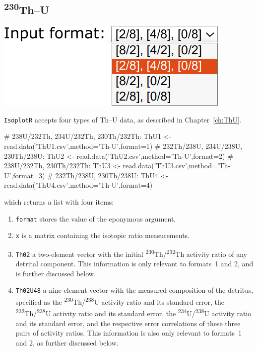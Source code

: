 \begin{refsection}

\chapter{\textsuperscript{230}Th--U}\label{ch:ThU-R}

\noindent\begin{minipage}[t]{.3\linewidth}
\strut\vspace*{-\baselineskip}\newline
\includegraphics[width=\linewidth]{../figures/ThUformats.png}
\end{minipage}
\begin{minipage}[t]{.7\linewidth}
\texttt{IsoplotR} accepts four types of Th--U data, as
  described in Chapter~\ref{ch:ThU}.
\end{minipage}

\begin{script}
# 238U/232Th, 234U/232Th, 230Th/232Th:
ThU1 <- read.data('ThU1.csv',method='Th-U',format=1)
# 232Th/238U, 234U/238U, 230Th/238U:
ThU2 <- read.data('ThU2.csv',method='Th-U',format=2)
# 238U/232Th, 230Th/232Th:
ThU3 <- read.data('ThU3.csv',method='Th-U',format=3)
# 232Th/238U, 230Th/238U:
ThU4 <- read.data('ThU4.csv',method='Th-U',format=4)
\end{script}

\noindent which returns a list with four items:

\begin{enumerate}
\item\texttt{format} stores the value of the eponymous argument,
\item\texttt{x} is a matrix containing the isotopic ratio measurements.
\item\texttt{Th02} a two-element vector with the initial
  \textsuperscript{230}Th/\textsuperscript{232}Th activity ratio of
  any detrital component. This information is only relevant to
  formats~1 and 2, and is further discussed below.
\item\texttt{Th02U48} a nine-element vector with the measured
  composition of the detritus, specified as the
  \textsuperscript{230}Th/\textsuperscript{238}U activity ratio and
  its standard error, the
  \textsuperscript{232}Th/\textsuperscript{238}U activity ratio and
  its standard error, the
  \textsuperscript{234}U/\textsuperscript{238}U activity ratio and its
  standard error, and the respective error correlations of these three
  pairs of activity ratios. This information is also only relevant to
  formats~1 and 2, as further discussed below.
\end{enumerate}


\end{refsection}
